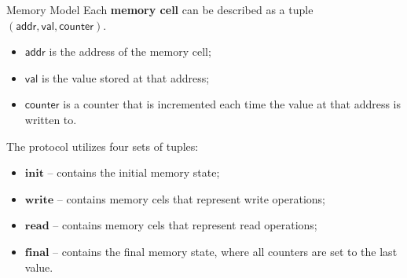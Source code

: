 \documentclass{zkdl-presentation-template}
\begin{document}
    \begin{frame}{Memory Model}
        Each \textbf{memory cell} can be described as a tuple $\mathsf{(addr, val, counter)}$.
        \begin{itemize}
            \item $\mathsf{addr}$ is the address of the memory cell;
            \vspace{-5px}
            \item $\mathsf{val}$ is the value stored at that address;
            \vspace{-5px}
            \item $\mathsf{counter}$ is a counter that is incremented each time the value at that address is written to.
        \end{itemize}

        

        \vspace{5px}
        The protocol utilizes four sets of tuples:
        \begin{itemize}
            \item $\mathbf{init}$ -- contains the initial memory state;
            \vspace{-5px}
            \item $\mathbf{write}$ -- contains memory cels that represent write operations;
            \vspace{-5px}
            \item $\mathbf{read}$ -- contains memory cels that represent read operations;
            \vspace{-5px}
            \item $\mathbf{final}$ -- contains the final memory state, where all counters are set to the last value.
        \end{itemize}
    \end{frame}
\end{document}
